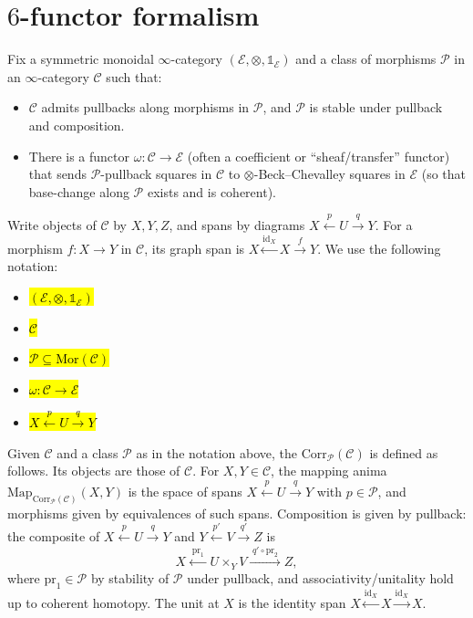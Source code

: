 



\section{$6$-functor formalism}

\begin{notation}
Fix a symmetric monoidal $\infty$-category $(\mathcal{E},\otimes,\mathds{1}_{\mathcal{E}})$ and a class of morphisms $\mathcal{P}$ in an $\infty$-category $\mathcal{C}$ such that:
\begin{itemize}
\item $\mathcal{C}$ admits pullbacks along morphisms in $\mathcal{P}$, and $\mathcal{P}$ is stable under pullback and composition.
\item There is a functor $\omega\colon \mathcal{C}\to \mathcal{E}$ (often a coefficient or “sheaf/transfer” functor) that sends $\mathcal{P}$-pullback squares in $\mathcal{C}$ to $\otimes$-Beck–Chevalley squares in $\mathcal{E}$ (so that base-change along $\mathcal{P}$ exists and is coherent).
\end{itemize}
Write objects of $\mathcal{C}$ by $X,Y,Z$, and spans by diagrams $X\xleftarrow{p} U\xrightarrow{q} Y$. For a morphism $f\colon X\to Y$ in $\mathcal{C}$, its graph span is $X\xleftarrow{\mathrm{id}_X} X\xrightarrow{f} Y$. We use the following notation:
\begin{itemize}
\item \hl{$(\mathcal{E},\otimes,\mathds{1}_{\mathcal{E}})$}
\item \hl{$\mathcal{C}$}
\item \hl{$\mathcal{P}\subseteq \mathrm{Mor}(\mathcal{C})$}
\item \hl{$\omega\colon \mathcal{C}\to \mathcal{E}$}
\item \hl{$X\xleftarrow{p} U\xrightarrow{q} Y$}
\end{itemize}
\end{notation}

\begin{definition}
Given $\mathcal{C}$ and a class $\mathcal{P}$ as in the notation above, the  $\mathrm{Corr}_{\mathcal{P}}(\mathcal{C})$ is defined as follows. Its objects are those of $\mathcal{C}$. For $X,Y\in \mathcal{C}$, the mapping anima $\mathrm{Map}_{\mathrm{Corr}_{\mathcal{P}}(\mathcal{C})}(X,Y)$ is the space of spans $X\xleftarrow{p} U\xrightarrow{q} Y$ with $p\in \mathcal{P}$, and morphisms given by equivalences of such spans. Composition is given by pullback: the composite of $X\xleftarrow{p} U\xrightarrow{q} Y$ and $Y\xleftarrow{p'} V\xrightarrow{q'} Z$ is
\[
X \xleftarrow{\;\mathrm{pr}_1\;} U\times_Y V \xrightarrow{\;q'\circ \mathrm{pr}_2\;} Z,
\]
where $\mathrm{pr}_1\in \mathcal{P}$ by stability of $\mathcal{P}$ under pullback, and associativity/unitality hold up to coherent homotopy. The unit at $X$ is the identity span $X\xleftarrow{\mathrm{id}_X} X \xrightarrow{\mathrm{id}_X} X$.
\end{definition}

